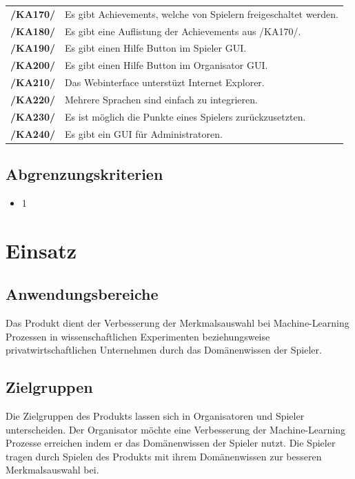 \documentclass[a4paper]{scrreprt}
\begin{document}
\begin{tabularx}{\linewidth}{@{}>{\bfseries}l@{\hspace{.5em}}X@{}}
        /KA170/ & Es gibt \Gls{Achievement}s, welche von Spielern freigeschaltet werden. \\
        /KA180/ & Es gibt eine Auflistung der \Gls{Achievement}s aus /KA170/. \\
        /KA190/ & Es gibt einen Hilfe Button im \Gls{Spieler} GUI. \\ %
        /KA200/ & Es gibt einen Hilfe Button im \Gls{Organisator} GUI. \\ %
        /KA210/ & Das Webinterface unterstüzt Internet Explorer. \\
        /KA220/ & Mehrere Sprachen sind einfach zu integrieren. \\
        /KA230/ & Es ist möglich die Punkte eines \Gls{Spieler}s zurückzusetzten. \\ %
        /KA240/ & Es gibt ein GUI für \Gls{Administrator}en. \\ %
    \end{tabularx}

    \section{Abgrenzungskriterien}
    \begin{itemize}
        \item 1
    \end{itemize}

    \chapter{Einsatz}

    \section{Anwendungsbereiche}
    Das \Gls{Produkt} dient der Verbesserung der Merkmalsauswahl bei Machine-Learning Prozessen in wissenschaftlichen
    Experimenten beziehungsweise privatwirtschaftlichen Unternehmen durch das Domänenwissen der \Gls{Spieler}.

    \section{Zielgruppen}
    Die Zielgruppen des \Gls{Produkt}s lassen sich in \Gls{Organisator}en und \Gls{Spieler} unterscheiden.
    Der Organisator möchte eine Verbesserung der Machine-Learning Prozesse erreichen indem er das Domänenwissen der Spieler nutzt.
    Die Spieler tragen durch Spielen des \Gls{Produkt}s mit ihrem Domänenwissen zur besseren Merkmalsauswahl bei.
\end{document}
